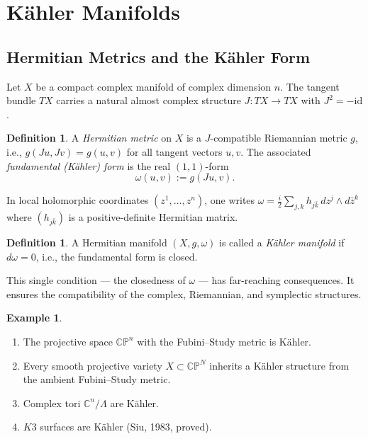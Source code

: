 \documentclass[12pt,a4paper]{amsart}
\theoremstyle{definition}
\newtheorem{definition}[theorem]{Definition}
\newtheorem{example}[theorem]{Example}
\theoremstyle{remark}
\begin{document}
\section{Kähler Manifolds}
\label{sec:kahler}

\subsection{Hermitian Metrics and the Kähler Form}

Let $X$ be a compact complex manifold of complex dimension $n$. The tangent
bundle $TX$ carries a natural almost complex structure $J: TX \to TX$ with $J^2 = -\mathrm{id}$.

\begin{definition}
A \emph{Hermitian metric} on $X$ is a $J$-compatible Riemannian metric $g$, i.e.,
$g(Ju, Jv) = g(u,v)$ for all tangent vectors $u,v$. The associated \emph{fundamental
(Kähler) form} is the real $(1,1)$-form
\[
  \omega(u,v) := g(Ju, v).
\]
\end{definition}

In local holomorphic coordinates $(z^1, \ldots, z^n)$, one writes
$\omega = \frac{i}{2}\sum_{j,k} h_{j\bar k}\, dz^j \wedge d\bar z^k$
where $(h_{j\bar k})$ is a positive-definite Hermitian matrix.

\begin{definition}
A Hermitian manifold $(X, g, \omega)$ is called a \emph{Kähler manifold} if
$d\omega = 0$, i.e., the fundamental form is closed.
\end{definition}

This single condition — the closedness of $\omega$ — has far-reaching consequences.
It ensures the compatibility of the complex, Riemannian, and symplectic structures.

\begin{example}
\begin{enumerate}[label=(\alph*)]
\item The projective space $\mathbb{CP}^n$ with the Fubini–Study metric is Kähler.
\item Every smooth projective variety $X \subset \mathbb{CP}^N$ inherits a Kähler
  structure from the ambient Fubini–Study metric.
\item Complex tori $\mathbb{C}^n / \Lambda$ are Kähler.
\item $K3$ surfaces are Kähler (Siu, 1983, proved).
\end{enumerate}
\end{example}
\end{document}
